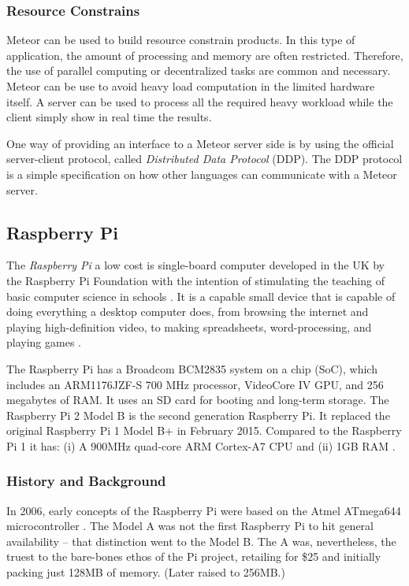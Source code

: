 \subsubsection{Resource Constrains}

Meteor can be used to build resource constrain products.
In this type of application, the amount of processing and memory are often restricted.
Therefore, the use of parallel computing or decentralized tasks are common and necessary.
Meteor can be use to avoid heavy load computation in the limited hardware itself.
A server can be used to process all the required heavy workload while the client simply show in real time the results.

One way of providing an interface to a Meteor server side is by using the official server-client protocol, called \emph{Distributed Data Protocol} (DDP).
The DDP protocol is a simple specification on how other languages can communicate with a Meteor server.


\subsection{Raspberry Pi}

The \emph{Raspberry Pi} a low cost is single-board computer developed in the UK by the Raspberry Pi Foundation with the intention of stimulating the teaching of basic computer science in schools \cite{pi2012raspberry}.
It is a capable small device that is capable of doing everything a desktop computer does, from browsing the internet and playing high-definition video, to making spreadsheets, word-processing, and playing games \cite{resp2}.

The Raspberry Pi has a Broadcom BCM2835 system on a chip (SoC), which includes an ARM1176JZF-S 700 MHz processor, VideoCore IV GPU, and 256 megabytes of RAM. 
It uses an SD card for booting and long-term storage.
The Raspberry Pi 2 Model B is the second generation Raspberry Pi. 
It replaced the original Raspberry Pi 1 Model B+ in February 2015. 
Compared to the Raspberry Pi 1 it has: (i) A 900MHz quad-core ARM Cortex-A7 CPU and (ii) 1GB RAM \cite{resp2}.



\subsubsection{History and Background}

In 2006, early concepts of the Raspberry Pi were based on the Atmel ATmega644 microcontroller \cite{wong2011build}.
The Model A was not the first Raspberry Pi to hit general availability – that distinction went to the Model B. 
The A was, nevertheless, the truest to the bare-bones ethos of the Pi project, retailing for \$25 and initially packing just 128MB of memory. (Later raised to 256MB.)

